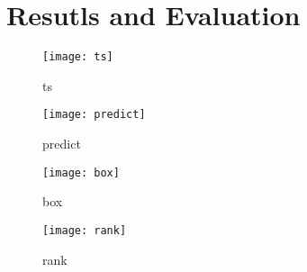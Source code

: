 \chapter{Resutls and Evaluation}

\begin{figure}
    \centering
    \texttt{[image: ts]}
    \caption{ts}\label{fig: ts}
\end{figure}

\begin{figure}
    \centering
    \texttt{[image: predict]}
    \caption{predict}\label{fig: predict}
\end{figure}

\begin{figure}
    \centering
    \texttt{[image: box]}
    \caption{box}\label{fig: box}
\end{figure}

\begin{figure}
    \centering
    \texttt{[image: rank]}
    \caption{rank}\label{fig: rank}
\end{figure}


